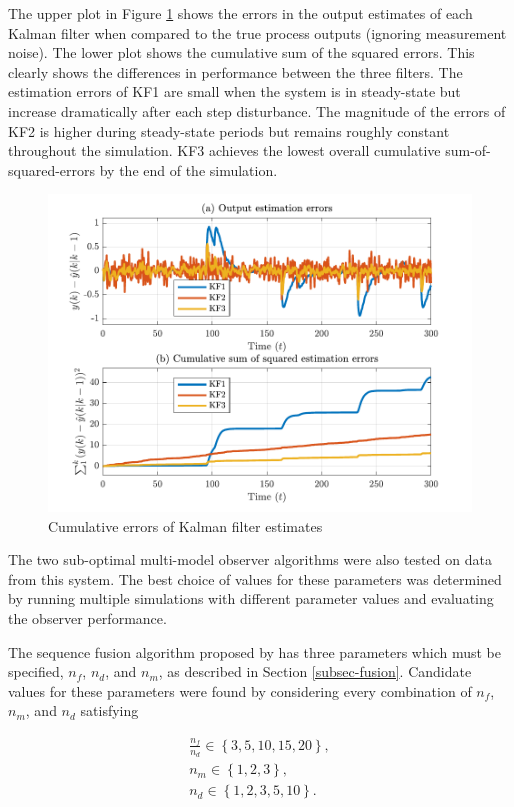 The upper plot in Figure \ref{fig:sim-sys-siso-KF123-cumerr} shows the errors in the output estimates of each Kalman filter when compared to the true process outputs (ignoring measurement noise). The lower plot shows the cumulative sum of the squared errors. This clearly shows the differences in performance between the three filters. The estimation errors of KF1 are small when the system is in steady-state but increase dramatically after each step disturbance. The magnitude of the errors of KF2 is higher during steady-state periods but remains roughly constant throughout the simulation. KF3 achieves the lowest overall cumulative sum-of-squared-errors by the end of the simulation.
\begin{figure}[htp]
	\centering
	\includegraphics[width=14cm]{images/sim_sys_1_3_y1_err.pdf}
	\caption{Cumulative errors of Kalman filter estimates}
	\label{fig:sim-sys-siso-KF123-cumerr}
\end{figure}

The two sub-optimal multi-model observer algorithms were also tested on data from this system. The best choice of values for these parameters was determined by running multiple simulations with different parameter values and evaluating the observer performance. 

The sequence fusion algorithm proposed by \cite{robertson_method_1998} has three parameters which must be specified, $n_f$, $n_d$, and $n_m$, as described in Section \ref{subsec-fusion}. Candidate values for these parameters were found by considering every combination of $n_f$, $n_m$, and $n_d$ satisfying

\begin{equation} \label{eq:sim-sys-siso-MKF-SF-param-values}
	\begin{aligned}
		\frac{n_f}{n_d} \in \left\{3, 5, 10, 15, 20\right\},  \\
		n_m \in \left\{1, 2, 3\right\},  \\
		n_d \in \left\{1, 2, 3, 5, 10\right\}.  \\
	\end{aligned}
\end{equation}

